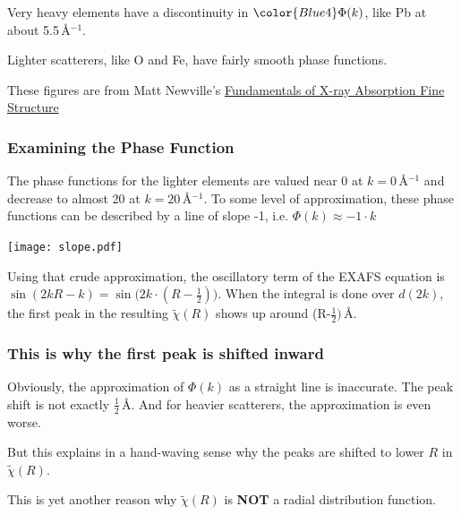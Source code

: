\documentclass[10pt, xcolor=x11names, compress]{beamer}
\begin{document}
\begin{frame}
  Very heavy elements have a discontinuity in
  ${\color{Blue4}\Phi(k)}$, like Pb at about 5.5\,\AA$^{-1}$.

  \bigskip

  Lighter scatterers, like O and Fe, have fairly smooth phase
  functions.
  
  \begin{bottomnote}[0.5][19]%
    These figures are from Matt Newville's
    \href{http://xafs.org/Tutorials?action=AttachFile&do=get&target=Newville_xas_fundamentals.pdf}{\color{LightBlue4}Fundamentals of X-ray Absorption Fine Structure}
  \end{bottomnote}
\end{frame}

\begin{frame}
  \frametitle{Examining the Phase Function}
  \small
  
  The phase functions for the lighter elements are valued near 0 at
  $k=0$\,\AA$^{-1}$ and decrease to almost 20 at $k=20$\,\AA$^{-1}$.
  To some level of approximation, these phase functions can be
  described by a line of slope -1, i.e. $\Phi(k) \approx -1\cdot k$

  \begin{center}
    \texttt{[image: slope.pdf]}
  \end{center}

  Using that crude approximation, the oscillatory term of the EXAFS
  equation is $\sin(2kR - k) = \sin\big(2k\cdot(R-\frac{1}{2})\big)$.
  When the integral is done over $d(2k)$, the first peak in the
  resulting $\tilde\chi(R)$ shows up around (R-$\frac{1}{2})$\,\AA.
\end{frame}

\begin{frame}
  \frametitle{This is why the first peak is shifted inward}
  Obviously, the approximation of $\Phi(k)$ as a straight line is
  inaccurate.  The peak shift is not exactly $\frac{1}{2}$\,\AA.  And
  for heavier scatterers, the approximation is even worse.

  \bigskip

  But this explains in a hand-waving sense why the peaks are shifted
  to lower $R$ in $\tilde\chi(R)$.

  \bigskip

  This is yet another reason why $\tilde\chi(R)$ is \textbf{NOT} a
  radial distribution function.
\end{frame}
\end{document}
